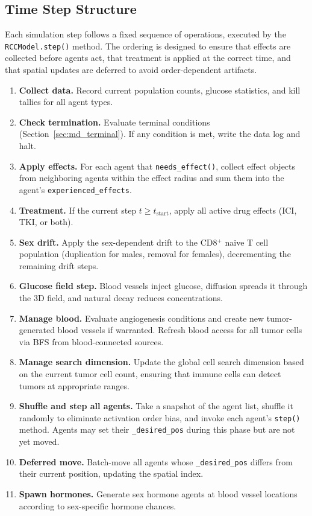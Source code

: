 \subsection{Time Step Structure}
\label{subsec:md_timestep}

Each simulation step follows a fixed sequence of operations, executed by the \texttt{RCCModel.step()} method. The ordering is designed to ensure that effects are collected before agents act, that treatment is applied at the correct time, and that spatial updates are deferred to avoid order-dependent artifacts.

\begin{enumerate}
    \item \textbf{Collect data.} Record current population counts, glucose statistics, and kill tallies for all agent types.
    \item \textbf{Check termination.} Evaluate terminal conditions (Section~\ref{sec:md_terminal}). If any condition is met, write the data log and halt.
    \item \textbf{Apply effects.} For each agent that \texttt{needs\_effect()}, collect effect objects from neighboring agents within the effect radius and sum them into the agent's \texttt{experienced\_effects}.
    \item \textbf{Treatment.} If the current step $t \geq t_{\text{start}}$, apply all active drug effects (ICI, TKI, or both).
    \item \textbf{Sex drift.} Apply the sex-dependent drift to the CD8$^+$ naive T cell population (duplication for males, removal for females), decrementing the remaining drift steps.
    \item \textbf{Glucose field step.} Blood vessels inject glucose, diffusion spreads it through the 3D field, and natural decay reduces concentrations.
    \item \textbf{Manage blood.} Evaluate angiogenesis conditions and create new tumor-generated blood vessels if warranted. Refresh blood access for all tumor cells via BFS from blood-connected sources.
    \item \textbf{Manage search dimension.} Update the global cell search dimension based on the current tumor cell count, ensuring that immune cells can detect tumors at appropriate ranges.
    \item \textbf{Shuffle and step all agents.} Take a snapshot of the agent list, shuffle it randomly to eliminate activation order bias, and invoke each agent's \texttt{step()} method. Agents may set their \texttt{\_desired\_pos} during this phase but are not yet moved.
    \item \textbf{Deferred move.} Batch-move all agents whose \texttt{\_desired\_pos} differs from their current position, updating the spatial index.
    \item \textbf{Spawn hormones.} Generate sex hormone agents at blood vessel locations according to sex-specific hormone chances.
\end{enumerate}

